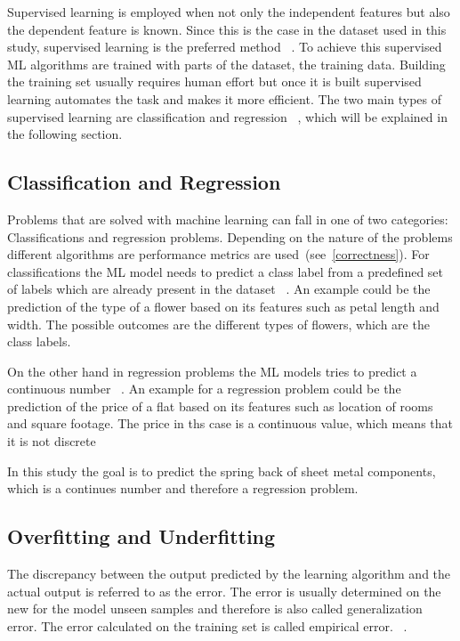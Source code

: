 Supervised learning is employed when not only the independent features but also the dependent feature is known.
Since this is the case in the dataset used in this study, supervised learning is the preferred
method
~\cite[p. 2]{muller_introductionmachinelearning_2016}.
To achieve this supervised \ac{ML} algorithms are trained with parts of the dataset, the training data.
Building the training set usually requires human effort but once it is built supervised learning automates the task
and makes it more efficient.
The two main types of supervised learning are classification and regression
~\cite[p. 25]{muller_introductionmachinelearning_2016}, which will be explained in the following section.

\subsection{Classification and Regression}\label{subsec:regression}
Problems that are solved with machine learning can fall in one of two categories: Classifications and regression
problems.
Depending on the nature of the problems different algorithms are performance metrics are used~(see~\cref{correctness}).
For classifications the ML model needs to predict a class label from a predefined set of labels which are already
present in the dataset
~\cite[pp. 25--26]{muller_introductionmachinelearning_2016}.
An example could be the prediction of the type of a flower based on its features such as
petal length and width.
The possible outcomes are the different types of flowers, which are the class labels.

On the other hand in regression problems the ML models tries to predict a continuous number
~\cite[pp. 25--26]{muller_introductionmachinelearning_2016}.
An example for a regression problem could be the prediction of the price of a flat based on its features such as
location of rooms and square footage.
The price in ths case is a continuous value, which means that it is not discrete

In this study the goal is to predict the spring back of sheet metal components, which is a continues number and
therefore a regression problem.

\subsection{Overfitting and Underfitting}\label{subsec:overfitting-and-underfitting}
The discrepancy between the output predicted by the learning algorithm and the actual output is referred to as the
error.
The error is usually determined on the new for the model unseen samples and therefore is also
called generalization error.
The error calculated on the training set is called empirical error.
~\cite[p. 26]{zhou_machinelearning_2021}.

